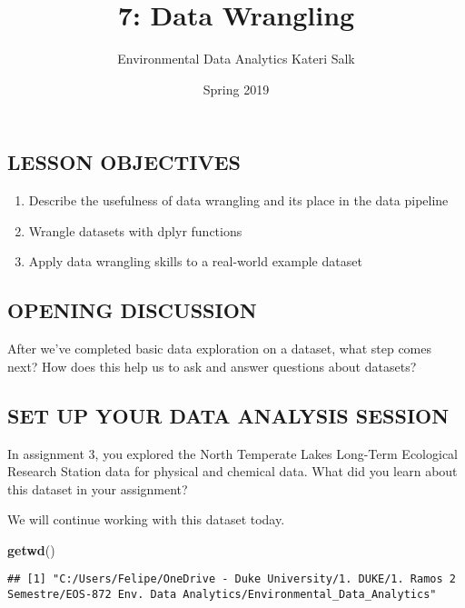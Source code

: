 \documentclass[]{article}
\title{7: Data Wrangling}
\author{Environmental Data Analytics \textbar{} Kateri Salk}
\date{Spring 2019}
\newenvironment{Shaded}{\begin{snugshade}}{\end{snugshade}}
\newcommand{\KeywordTok}[1]{\textcolor[rgb]{0.13,0.29,0.53}{\textbf{#1}}}
\newcommand{\NormalTok}[1]{#1}
\providecommand{\tightlist}{%
  \setlength{\itemsep}{0pt}\setlength{\parskip}{0pt}}
\begin{document}
\maketitle

\subsection{LESSON OBJECTIVES}\label{lesson-objectives}

\begin{enumerate}
\def\labelenumi{\arabic{enumi}.}
\tightlist
\item
  Describe the usefulness of data wrangling and its place in the data
  pipeline
\item
  Wrangle datasets with dplyr functions
\item
  Apply data wrangling skills to a real-world example dataset
\end{enumerate}

\subsection{OPENING DISCUSSION}\label{opening-discussion}

After we've completed basic data exploration on a dataset, what step
comes next? How does this help us to ask and answer questions about
datasets?

\subsection{SET UP YOUR DATA ANALYSIS
SESSION}\label{set-up-your-data-analysis-session}

In assignment 3, you explored the North Temperate Lakes Long-Term
Ecological Research Station data for physical and chemical data. What
did you learn about this dataset in your assignment?

We will continue working with this dataset today.

\begin{Shaded}
\begin{Highlighting}[]
\KeywordTok{getwd}\NormalTok{()}
\end{Highlighting}
\end{Shaded}

\begin{verbatim}
## [1] "C:/Users/Felipe/OneDrive - Duke University/1. DUKE/1. Ramos 2 Semestre/EOS-872 Env. Data Analytics/Environmental_Data_Analytics"
\end{verbatim}
\end{document}
